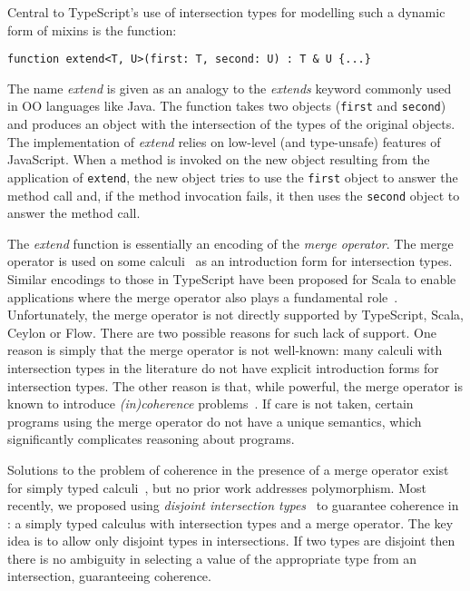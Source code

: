 Central to TypeScript's use of intersection types for modelling such a
dynamic form of mixins is the function:

\begin{lstlisting}
function extend<T, U>(first: T, second: U) : T & U {...}
\end{lstlisting}

\noindent The name \emph{extend} is given as an analogy to the
\emph{extends} keyword commonly used in OO languages like Java.
The function takes two objects (\lstinline{first} and
\lstinline{second}) and produces an object with the intersection of
the types of the original objects. The implementation of
\emph{extend} relies on low-level (and type-unsafe) features of 
JavaScript. When a method is invoked on the new object resulting from 
the application of \lstinline{extend}, the new object tries to use the 
\lstinline{first} object to answer the method call and, if the method
invocation fails, it then uses the \lstinline{second} object to answer
the method call. 

The \emph{extend} function is essentially an encoding of the
\emph{merge operator}. The merge operator is used on some
calculi~\cite{reynolds1997design,reynolds1991coherence,castagna1995calculus,dunfield2014elaborating,oliveira16disjoint} as
an introduction form for intersection types. Similar encodings to
those in TypeScript have been proposed for Scala to enable
applications where the merge operator also plays a fundamental
role~\cite{oliveira2013feature,Rendel14OA}. 
Unfortunately, the merge operator is not directly
supported by TypeScript, Scala, Ceylon or Flow. There are two possible
reasons for such lack of support. One reason is simply that the merge operator is
not well-known: many calculi with intersection types in the literature
do not have explicit introduction forms for intersection types. The
other reason is that, while powerful, the merge operator is known
to introduce \emph{(in)coherence} problems~\cite{reynolds1991coherence,dunfield2014elaborating}.  
If care is not
taken, certain programs using the merge operator do not have a unique
semantics, which significantly complicates reasoning about programs.

Solutions to the problem of coherence in the presence 
of a merge operator exist for simply typed
calculi~\cite{reynolds1997design,reynolds1991coherence,castagna1995calculus,oliveira16disjoint}, 
but no prior work addresses polymorphism. Most recently, we
proposed using \emph{disjoint intersection types}~\cite{oliveira16disjoint} to 
guarantee coherence in \oldname: a simply typed calculus with intersection types and a merge 
operator. The key idea is to allow only disjoint types in
intersections. If two types are disjoint then there is no ambiguity in
selecting a value of the appropriate type from an intersection, 
guaranteeing coherence.

